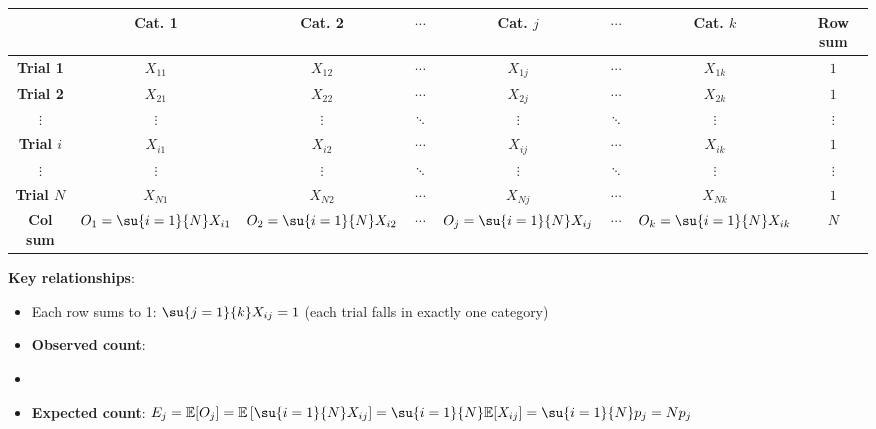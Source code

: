\begin{center}
\begin{tabular}{|c|*{6}{c}|c|}
    \hline
    & \textbf{Cat. 1} & \textbf{Cat. 2} & $\cdots$ & \textbf{Cat. $j$} & $\cdots$ & \textbf{Cat. $k$} & \textbf{Row sum} \\
    \hline
    \textbf{Trial 1} & $X_{11}$ & $X_{12}$ & $\cdots$ & $X_{1j}$ & $\cdots$ & $X_{1k}$ & $1$ \\
    \textbf{Trial 2} & $X_{21}$ & $X_{22}$ & $\cdots$ & $X_{2j}$ & $\cdots$ & $X_{2k}$ & $1$ \\
    $\vdots$ & $\vdots$ & $\vdots$ & $\ddots$ & $\vdots$ & $\ddots$ & $\vdots$ & $\vdots$ \\
    \textbf{Trial $i$} & $X_{i1}$ & $X_{i2}$ & $\cdots$ & $X_{ij}$ & $\cdots$ & $X_{ik}$ & $1$ \\
    $\vdots$ & $\vdots$ & $\vdots$ & $\ddots$ & $\vdots$ & $\ddots$ & $\vdots$ & $\vdots$ \\
    \textbf{Trial $N$} & $X_{N1}$ & $X_{N2}$ & $\cdots$ & $X_{Nj}$ & $\cdots$ & $X_{Nk}$ & $1$ \\
    \hline
    \textbf{Col sum} & $O_1 = \su{i=1}{N}X_{i1}$ & $O_2 = \su{i=1}{N}X_{i2}$ & $\cdots$ & $O_j = \su{i=1}{N}X_{ij}$ & $\cdots$ & $O_k = \su{i=1}{N}X_{ik}$ & $N$ \\
    \hline
\end{tabular}
\end{center}

\textbf{Key relationships}:
\begin{itemize}
    \item Each row sums to 1: $\su{j=1}{k}X_{ij} = 1$ (each trial falls in exactly one category)
    \item \textbf{Observed count}: 
    \item {}
    \item \textbf{Expected count}: $E_j = \mathbb{E}[O_j] = \mathbb{E}\left[\su{i=1}{N}X_{ij}\right]
        = \su{i=1}{N}\mathbb{E}[X_{ij}] = \su{i=1}{N}p_j = Np_j$
\end{itemize}

